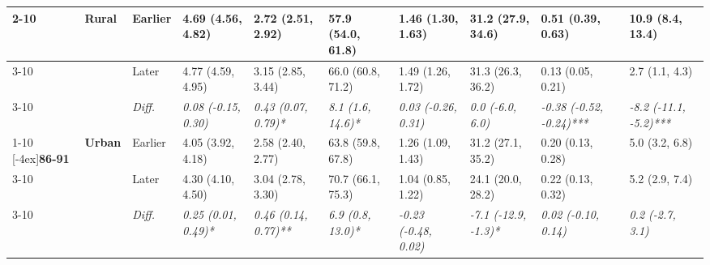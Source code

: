 \documentclass[12pt, a4paper]{article}
\begin{document}
\begin{appendices}
\begin{table}[!p]
{\begin{tabular}[t]{>{}l>{}lllllllll}
        \cmidrule{2-10}
                                              & \multirow{3}{*}{\textbf{Rural}} & Earlier                       & 4.69 (4.56, 4.82)                           & 2.72 (2.51, 2.92)                            & 57.9 (54.0, 61.8)                           & 1.46 (1.30, 1.63)                             & 31.2 (27.9, 34.6)                             & 0.51 (0.39, 0.63)                               & 10.9 (8.4, 13.4)                              \\
        \cmidrule{3-10}
                                              &                                 & Later                         & 4.77 (4.59, 4.95)                           & 3.15 (2.85, 3.44)                            & 66.0 (60.8, 71.2)                           & 1.49 (1.26, 1.72)                             & 31.3 (26.3, 36.2)                             & 0.13 (0.05, 0.21)                               & 2.7 (1.1, 4.3)                                \\
        \cmidrule{3-10}
                                              &                                 & \cellcolor{gray!10}\em{Diff.} & \cellcolor{gray!10}\em{0.08 (-0.15, 0.30)}  & \cellcolor{gray!10}\em{0.43 (0.07, 0.79)*}   & \cellcolor{gray!10}\em{8.1 (1.6, 14.6)*}    & \cellcolor{gray!10}\em{0.03 (-0.26, 0.31)}    & \cellcolor{gray!10}\em{0.0 (-6.0, 6.0)}       & \cellcolor{gray!10}\em{-0.38 (-0.52, -0.24)***} & \cellcolor{gray!10}\em{-8.2 (-11.1, -5.2)***} \\
        \cmidrule{1-10}
        \multirow{9}{*}[-4ex]{\textbf{86-91}} & \multirow{3}{*}{\textbf{Urban}} & Earlier                       & 4.05 (3.92, 4.18)                           & 2.58 (2.40, 2.77)                            & 63.8 (59.8, 67.8)                           & 1.26 (1.09, 1.43)                             & 31.2 (27.1, 35.2)                             & 0.20 (0.13, 0.28)                               & 5.0 (3.2, 6.8)                                \\
        \cmidrule{3-10}
                                              &                                 & Later                         & 4.30 (4.10, 4.50)                           & 3.04 (2.78, 3.30)                            & 70.7 (66.1, 75.3)                           & 1.04 (0.85, 1.22)                             & 24.1 (20.0, 28.2)                             & 0.22 (0.13, 0.32)                               & 5.2 (2.9, 7.4)                                \\
        \cmidrule{3-10}
                                              &                                 & \cellcolor{gray!10}\em{Diff.} & \cellcolor{gray!10}\em{0.25 (0.01, 0.49)*}  & \cellcolor{gray!10}\em{0.46 (0.14, 0.77)**}  & \cellcolor{gray!10}\em{6.9 (0.8, 13.0)*}    & \cellcolor{gray!10}\em{-0.23 (-0.48, 0.02)}   & \cellcolor{gray!10}\em{-7.1 (-12.9, -1.3)*}   & \cellcolor{gray!10}\em{0.02 (-0.10, 0.14)}      & \cellcolor{gray!10}\em{0.2 (-2.7, 3.1)}       \\

\end{tabular}}
\end{table}
\end{appendices}
\end{document}
